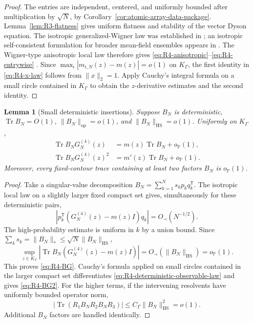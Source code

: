 \documentclass[11pt]{article}
\newtheorem{lemma}[theorem]{Lemma}
\theoremstyle{definition}
\theoremstyle{remark}
\newcommand{\Tr}{\operatorname{Tr}}
\newcommand{\op}{\mathrm{op}}
\newcommand{\HS}{\mathrm{HS}}
\newcommand{\norm}[1]{\lVert #1\rVert}
\begin{document}
\begin{proof}
The entries are independent, centered, and uniformly bounded after
multiplication by \(\sqrt N\), by
Corollary~\ref{cor:atomic-array-data-package}.  Lemma~\ref{lem:R3-flatness}
gives uniform flatness and stability of the vector Dyson equation.
The isotropic generalized-Wigner law was established in
\cite{BloemendalErdosKnowlesYauYin2014}; an isotropic self-consistent
formulation for broader mean-field ensembles appears in
\cite{HeKnowlesRosenthal2018}.
The Wigner-type anisotropic local law therefore gives
\eqref{eq:R4-anisotropic}--\eqref{eq:R4-entrywise}
\cite{AEK2017WignerType}.  Since
\(\max_i|m_{i,N}(z)-m(z)|=o(1)\) on \(K_\Gamma\), the first identity in
\eqref{eq:R4-x-law} follows from \(\norm{x}_2=1\).  Apply Cauchy's integral
formula on a small circle contained in \(K_\Gamma\) to obtain the
\(z\)-derivative estimates and the second identity.
\end{proof}

\begin{lemma}[Small deterministic insertions]
\label{lem:R4-small-insertion}
Suppose \(B_N\) is deterministic,
\(\Tr B_N=O(1)\), \(\norm{B_N}_{\op}=o(1)\), and
\(\norm{B_N}_{\HS}=o(1)\).  Uniformly on \(K_\Gamma\),
\begin{align}
 \Tr B_NG_N^{(4)}(z)&=m(z)\Tr B_N+o_{\mathbb P}(1),\label{eq:R4-BG}\\
 \Tr B_NG_N^{(4)}(z)^2&=m'(z)\Tr B_N+o_{\mathbb P}(1).
 \label{eq:R4-BG2}
\end{align}
Moreover, every fixed-contour trace containing at least two factors \(B_N\)
is \(o_{\mathbb P}(1)\).
\end{lemma}

\begin{proof}
Take a singular-value decomposition
\(B_N=\sum_{k=1}^N s_kp_kq_k^{\mathsf T}\).  The isotropic local law on a
slightly larger fixed compact set gives, simultaneously for these
deterministic pairs,
\[
 \left|p_k^{\mathsf T}(G_N^{(4)}(z)-m(z)I)q_k\right|
 =O_\prec(N^{-1/2}).
\]
The high-probability estimate is uniform in \(k\) by a union bound.  Since
\(\sum_ks_k=\norm{B_N}_*\le\sqrt N\norm{B_N}_{\HS}\),
\begin{equation}\label{eq:R4-deterministic-observable-law}
 \sup_{z\in K_\Gamma}
 \left|\Tr B_N(G_N^{(4)}(z)-m(z)I)\right|
 =O_\prec(\norm{B_N}_{\HS})=o_{\mathbb P}(1).
\end{equation}
This proves \eqref{eq:R4-BG}.  Cauchy's formula applied on small circles
contained in the larger compact set differentiates
\eqref{eq:R4-deterministic-observable-law} and gives
\eqref{eq:R4-BG2}.  For the higher terms, if the intervening resolvents have
uniformly bounded operator norm,
\[
 |\Tr(R_1B_NR_2B_NR_3)|
 \le C_\Gamma\norm{B_N}_{\HS}^2=o(1).
\]
Additional \(B_N\) factors are handled identically.
\end{proof}
\end{document}
